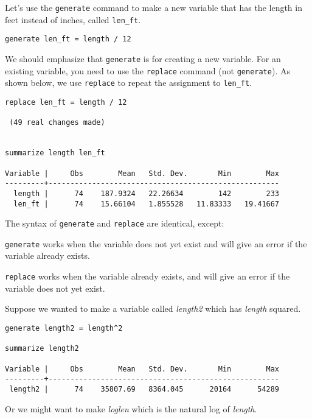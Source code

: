 Let's use the \lstinline{generate} command to make a new variable that has the length in feet instead of inches, called \lstinline{len_ft}.

\begin{lstlisting}
generate len_ft = length / 12
\end{lstlisting}

We should emphasize that \lstinline{generate} is for creating a new variable. For an existing variable, you need to use the \lstinline{replace} command (not \lstinline{generate}). As shown below, we use \lstinline{replace} to repeat the assignment to \lstinline{len_ft}.

\begin{lstlisting}
replace len_ft = length / 12

 (49 real changes made)


summarize length len_ft

Variable |     Obs        Mean   Std. Dev.       Min        Max
---------+-----------------------------------------------------
  length |      74    187.9324   22.26634        142        233
  len_ft |      74    15.66104   1.855528   11.83333   19.41667
\end{lstlisting}

The syntax of \lstinline{generate} and \lstinline{replace} are identical, except:
\begin{compactitem}
\item \lstinline{generate} works when the variable does not yet exist and will give an error if the variable already exists.
\item \lstinline{replace} works when the variable already exists, and will give an error if the variable does not yet exist.
\end{compactitem}

Suppose we wanted to make a variable called \textit{length2} which has \textit{length} squared.

\begin{lstlisting}
generate length2 = length^2

summarize length2

Variable |     Obs        Mean   Std. Dev.       Min        Max
---------+-----------------------------------------------------
 length2 |      74    35807.69   8364.045      20164      54289
\end{lstlisting}

Or we might want to make \textit{loglen} which is the natural log of \textit{length}.

